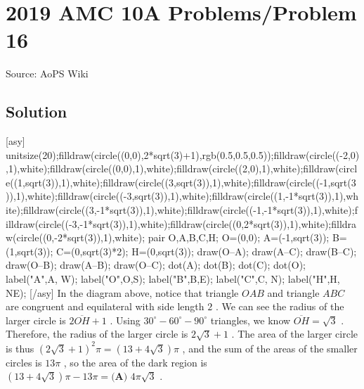 \documentclass[12pt]{article}
\begin{document}
\section*{{2019 AMC 10A Problems/Problem 16}}
Source: AoPS Wiki

\subsection*{Solution}
[asy] unitsize(20);filldraw(circle((0,0),2*sqrt(3)+1),rgb(0.5,0.5,0.5));filldraw(circle((-2,0),1),white);filldraw(circle((0,0),1),white);filldraw(circle((2,0),1),white);filldraw(circle((1,sqrt(3)),1),white);filldraw(circle((3,sqrt(3)),1),white);filldraw(circle((-1,sqrt(3)),1),white);filldraw(circle((-3,sqrt(3)),1),white);filldraw(circle((1,-1*sqrt(3)),1),white);filldraw(circle((3,-1*sqrt(3)),1),white);filldraw(circle((-1,-1*sqrt(3)),1),white);filldraw(circle((-3,-1*sqrt(3)),1),white);filldraw(circle((0,2*sqrt(3)),1),white);filldraw(circle((0,-2*sqrt(3)),1),white); pair O,A,B,C,H; O=(0,0); A=(-1,sqrt(3)); B=(1,sqrt(3)); C=(0,sqrt(3)*2); H=(0,sqrt(3)); draw(O--A); draw(A--C); draw(B--C); draw(O--B); draw(A--B); draw(O--C); dot(A); dot(B); dot(C); dot(O); label("A",A, W); label("O",O,S); label("B",B,E); label("C",C, N); label("H",H, NE); [/asy] In the diagram above, notice that triangle $OAB$ and triangle $ABC$ are congruent and equilateral with side length $2$ . We can see the radius of the larger circle is $2\overline{OH} + 1$ . Using $30^{\circ}-60^{\circ}-90^{\circ}$ triangles, we know $\overline{OH} = \sqrt{3}$ . Therefore, the radius of the larger circle is $2\sqrt{3}+1$ . The area of the larger circle is thus $\left(2\sqrt{3}+1\right)^2 \pi = \left(13+4\sqrt{3}\right)\pi$ , and the sum of the areas of the smaller circles is $13\pi$ , so the area of the dark region is $\left(13+4\sqrt{3}\right)\pi-13\pi = \boxed{\textbf{(A) } 4 \pi \sqrt{3}}$ .
\end{document}

